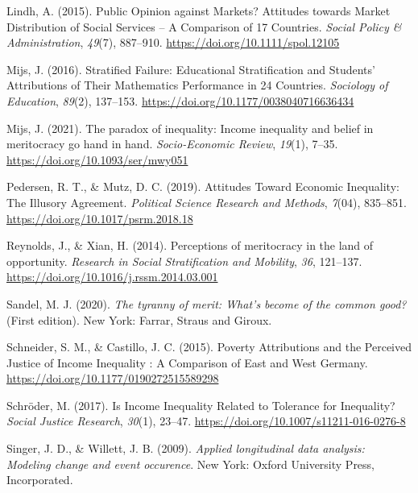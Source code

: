 \documentclass[
  12pt,
]{article}
\newlength{\cslhangindent}
\newenvironment{CSLReferences}[2] %
 {\begin{list}{}{%
  \setlength{\itemindent}{0pt}
  \setlength{\leftmargin}{0pt}
  \setlength{\parsep}{0pt}
  \ifodd #1
   \setlength{\leftmargin}{\cslhangindent}
   \setlength{\itemindent}{-1\cslhangindent}
  \fi
  \setlength{\itemsep}{#2\baselineskip}}}
 {\end{list}}
\begin{document}
\begin{CSLReferences}{1}{0}
Lindh, A. (2015). Public {Opinion} against {Markets}? {Attitudes}
towards {Market Distribution} of {Social Services} -- {A Comparison} of
17 {Countries}. \emph{Social Policy \& Administration}, \emph{49}(7),
887--910. \url{https://doi.org/10.1111/spol.12105}

Mijs, J. (2016). Stratified {Failure}: {Educational Stratification} and
{Students}' {Attributions} of {Their Mathematics Performance} in 24
{Countries}. \emph{Sociology of Education}, \emph{89}(2), 137--153.
\url{https://doi.org/10.1177/0038040716636434}

Mijs, J. (2021). The paradox of inequality: Income inequality and belief
in meritocracy go hand in hand. \emph{Socio-Economic Review},
\emph{19}(1), 7--35. \url{https://doi.org/10.1093/ser/mwy051}

Pedersen, R. T., \& Mutz, D. C. (2019). Attitudes {Toward Economic
Inequality}: {The Illusory Agreement}. \emph{Political Science Research
and Methods}, \emph{7}(04), 835--851.
\url{https://doi.org/10.1017/psrm.2018.18}

Reynolds, J., \& Xian, H. (2014). Perceptions of meritocracy in the land
of opportunity. \emph{Research in Social Stratification and Mobility},
\emph{36}, 121--137. \url{https://doi.org/10.1016/j.rssm.2014.03.001}

Sandel, M. J. (2020). \emph{The tyranny of merit: {What}'s become of the
common good?} (First edition). New York: {Farrar, Straus and Giroux}.

Schneider, S. M., \& Castillo, J. C. (2015). Poverty {Attributions} and
the {Perceived Justice} of {Income Inequality} : {A Comparison} of
{East} and {West Germany}.
\url{https://doi.org/10.1177/0190272515589298}

Schröder, M. (2017). Is {Income Inequality Related} to {Tolerance} for
{Inequality}? \emph{Social Justice Research}, \emph{30}(1), 23--47.
\url{https://doi.org/10.1007/s11211-016-0276-8}

Singer, J. D., \& Willett, J. B. (2009). \emph{Applied longitudinal data
analysis: Modeling change and event occurence}. New York: Oxford
University Press, Incorporated.


\end{CSLReferences}
\end{document}
